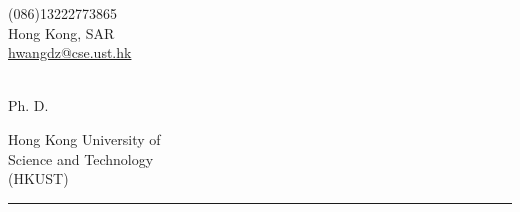 \begin{center}
    \author{Huaijin Wang}
    \def\role{Ph. D.}
	\begin{minipage}[b]{.3\textwidth}
	\raggedright
	{\large (086)13222773865} \\ %
	{Hong Kong, SAR} \\ %
	\def\email{hwangdz@cse.ust.hk}
	\href{mailto:\email}{\email} %
	\end{minipage}%
	\begin{minipage}[b]{.4\textwidth}
	\makeatletter
	\centering {\HUGE \@author} \\
	\makeatother
    \vspace{.5em}
    {\color{highlight} \Large{\role}}
	\end{minipage}%
	\begin{minipage}[b]{.3\textwidth}
	\raggedleft
        Hong Kong University of \\Science and Technology\\ (HKUST) %
	\end{minipage}

{\color{highlight} \hrule}
\end{center}
